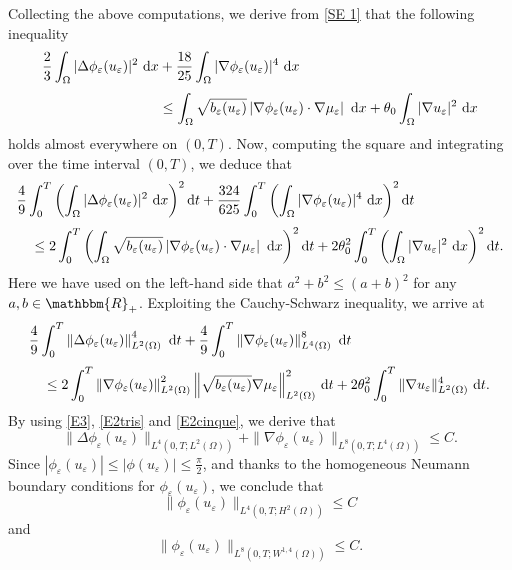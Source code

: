 \documentclass[11pt,  reqno]{amsart}%
\theoremstyle{plain}
\theoremstyle{definition}
\theoremstyle{remark}
\numberwithin{equation}{section}
\newcommand{\ve}{\varepsilon}
\newcommand{\dx}{\textup{d}x}
\newcommand{\dt}{\textup{d}t}
\begin{document}
Collecting the above computations, we derive from \eqref{SE 1} that the following inequality
\begin{align*}
\frac23 \int_\Omega |\Delta \phi_\ve(u_\ve)|^2 \ \dx 
      &+\dfrac{18}{25}\int_\Omega  |\nabla \phi_\ve(u_\ve)|^4 \ \dx
 \\[3pt]
 &\leq 
 \int_\Omega \sqrt{b_\ve(u_\ve)} \left|\nabla \phi_\ve(u_\ve) \cdot \nabla \mu_\ve \right| \ \dx + \theta_0 \int_\Omega |\nabla u_\ve |^2 \ \dx
\end{align*}
holds almost everywhere on $(0,T)$. Now, computing the square and integrating over the time interval $(0,T)$, we deduce that
	\begin{align}
& \frac{4}{9} \int_0^T \left( \int_\Omega |\Delta \phi_\ve(u_\ve)|^2 \ \dx \right)^2  \dt
+\dfrac{324}{625} \int_0^T \left( \int_\Omega  |\nabla \phi_\ve(u_\ve)|^4 \ \dx \right)^2 \dt
\notag
	 \\[3pt]
&\quad \le  2  \int_0^T \left( \int_\Omega \sqrt{b_\ve(u_\ve)}
\left| \nabla \phi_\ve(u_\ve) \cdot \nabla \mu_\ve  \right| \ \dx \right)^2 \dt + 2  \theta_0^2 \int_0^T \left( \int_\Omega |\nabla u_\ve |^2 \ \dx \right)^2 \dt.
	\label{SE 7}
	\end{align}
Here we have used on the left-hand side that $a^2+b^2 \leq (a+b)^2$ for any $a,b \in \mathbbm{R}_+$.	
Exploiting the Cauchy-Schwarz inequality, we arrive at
	\begin{align}
		&\frac49 \int_0^T \left\| \Delta \phi_\ve(u_\ve) \right\|_{L^2(\Omega)}^4 \ \dt
		+\dfrac{4}{9} \int_0^T  \left\| \nabla \phi_\ve(u_\ve) \right\|_{L^4(\Omega)}^8 \ \dt
		\notag
		 \\[3pt]
		&\quad \le 2 \int_0^T \left\| \nabla \phi_\ve(u_\ve)\right\|_{L^2(\Omega)}^2 \Big\| \sqrt{b_\ve(u_\ve)} \nabla \mu_\ve \Big\|_{L^2(\Omega)}^2 \ \dt + 2 \theta_0^2 \int_0^T \| \nabla u_\ve \|_{L^2(\Omega)}^4 \ \dt.  
\label{SE 8}
	\end{align}
By using \eqref{E3}, \eqref{E2tris} and \eqref{E2cinque}, we derive that
\begin{equation}
    \label{delta phi(ueps)}
    \|\Delta \phi_\ve(u_\ve)\|_{L^4(0,T;L^2(\Omega))} + 
	\| \nabla \phi_\ve(u_\ve)\|_{L^8(0,T;L^4(\Omega))}
     \le C.
\end{equation}
Since  $|\phi_\ve(u_\ve)| \le |\phi(u_\ve)| \leq \frac{\pi}{2}$, and thanks to the homogeneous Neumann boundary conditions for $\phi_\ve(u_\ve)$, we conclude that
\begin{equation}
    \label{phiH2}
    \|\phi_\ve(u_\ve)\|_{L^4(0,T;H^2(\Omega))} \le C
\end{equation}
and
    \begin{equation}
        \label{phiW14}
        \|\phi_\ve(u_\ve)\|_{L^8(0,T;W^{1,4}(\Omega))} \le C.
    \end{equation}
    
\end{document}
